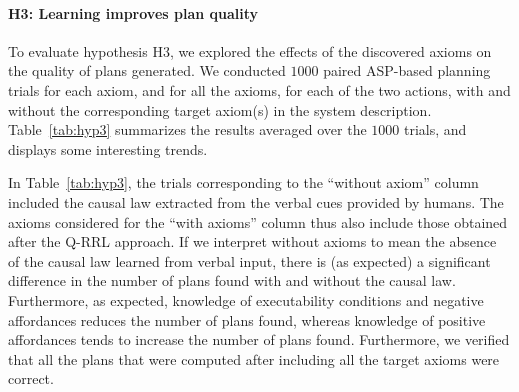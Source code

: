 \documentclass{article}
\begin{document}
\paragraph{H3: Learning improves plan quality}
To evaluate hypothesis H3, we explored the effects of the discovered
axioms on the quality of plans generated. We conducted $1000$ paired
ASP-based planning trials for each axiom, and for all the axioms, for
each of the two actions, with and without the corresponding target
axiom(s) in the system description.  Table~\ref{tab:hyp3} summarizes
the results averaged over the $1000$ trials, and displays some
interesting trends.

In Table~\ref{tab:hyp3}, the trials corresponding to the ``without
axiom'' column included the causal law extracted from the verbal cues
provided by humans. The axioms considered for the ``with axioms''
column thus also include those obtained after the Q-RRL approach. If
we interpret without axioms to mean the absence of the causal law
learned from verbal input, there is (as expected) a significant
difference in the number of plans found with and without the causal
law. Furthermore, as expected, knowledge of executability conditions
and negative affordances reduces the number of plans found, whereas
knowledge of positive affordances tends to increase the number of
plans found. Furthermore, we verified that all the plans that were
computed after including all the target axioms were correct.
\end{document}
